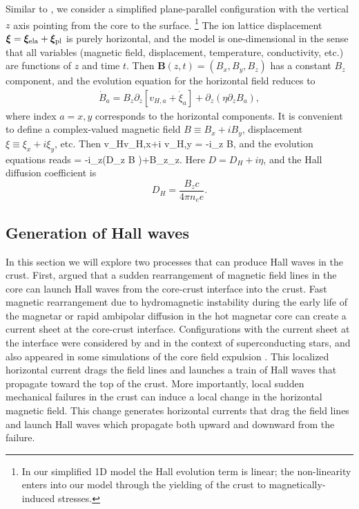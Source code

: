 Similar to \citet{2004ApJ...609..999C},
we consider a simplified plane-parallel configuration with the vertical $z$ axis pointing
from the core to the surface. 
\footnote{In our simplified 1D model the Hall evolution term is linear; the non-linearity enters into our model through the yielding of the crust to magnetically-induced stresses.}
The ion lattice displacement 
$\boldsymbol{\xi}=\boldsymbol{\xi}_{\rm ela}+\boldsymbol{\xi}_{\rm pl}$ 
is purely horizontal, and the model is one-dimensional in the sense that all variables  
(magnetic field, displacement, temperature, conductivity, etc.) are functions of $z$ and 
time $t$. Then $\boldsymbol{B}(z,t)=(B_x,B_y,B_z)$ has a constant $B_z$ component, and the evolution 
equation for the horizontal field reduces to
\begin{eqnarray}\label{vel}
\dot{B}_a=B_z\partial_z \left[v_{H,a}+\dot{\xi}_a\right]+\partial_z\left(\eta\partial_z B_a\right),
\end{eqnarray}
where 
index $a=x,y$ corresponds to the horizontal components.
It is convenient to define a complex-valued magnetic field $B\equiv B_x+i B_y$, displacement $\xi\equiv\xi_x+i\xi_y$, etc. 
Then
\beq
v_H\equiv v_{H,x}+i v_{H,y} = -i\partial_z B,
\eeq
and the evolution equations reads
\beq
\label{hall}
= -i\partial_z\left(D\partial_z B \right)+B_z\partial_z\dot{\xi}.
\eeq
Here $D=D_H+i\eta$, 
and the Hall diffusion coefficient is
\begin{equation}
 D_{H}=\frac{B_z c}{4\pi n_e e}.
\end{equation}
 
\subsection{Generation of Hall waves}\label{generation}
In this section we will explore two processes that can produce Hall waves in the crust. 
First, \citet{1996ApJ...473..322T} argued that a sudden rearrangement of magnetic field 
lines in the core can launch Hall waves from the core-crust interface into the crust. 
Fast magnetic rearrangement due to hydromagnetic instability during 
the early life of the
magnetar or rapid ambipolar diffusion in the hot magnetar core 
\citep{1992ApJ...395..250G,2016ApJ...833..261B} 
can create a current sheet at the core-crust interface. 
Configurations with the current sheet at the interface were considered by \citet{2013PhRvL.110g1101L} and \citet{2015MNRAS.453..671G} in the context of superconducting stars, and also appeared in some simulations of the core field expulsion \citep{2016MNRAS.456.4461E}.
This localized horizontal current drags the field lines and launches 
a train of Hall waves that propagate toward the top of the crust.
More importantly, local sudden mechanical failures in the crust can induce a
local change in the horizontal magnetic field. This change generates horizontal currents 
that drag the field lines and launch Hall waves which propagate both upward and downward
from the failure.

